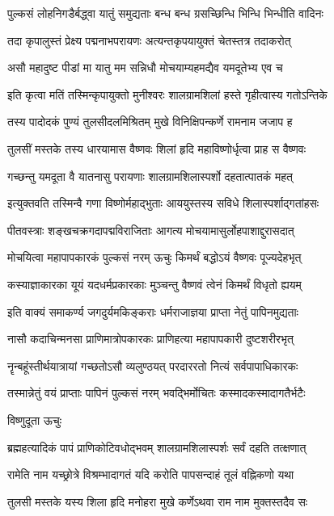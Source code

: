 \twolineshloka
{पुल्कसं लोहनिगडैर्बद्ध्वा यातुं समुद्यताः}
{बन्ध बन्ध ग्रसच्छिन्धि भिन्धि भिन्धीति वादिनः}%

\twolineshloka
{तदा कृपालुस्तं प्रेक्ष्य पद्मनाभपरायणः}
{अत्यन्तकृपयायुक्तं चेतस्तत्र तदाकरोत्}%

\twolineshloka
{असौ महादुष्ट पीडां मा यातु मम सन्निधौ}
{मोचयाम्यहमद्यैव यमदूतेभ्य एव च}%

\twolineshloka
{इति कृत्वा मतिं तस्मिन्कृपायुक्तो मुनीश्वरः}
{शालग्रामशिलां हस्ते गृहीत्वास्य गतोऽन्तिके}%

\twolineshloka
{तस्य पादोदकं पुण्यं तुलसीदलमिश्रितम्}
{मुखे विनिक्षिपन्कर्णे रामनाम जजाप ह}%

\twolineshloka
{तुलसीं मस्तके तस्य धारयामास वैष्णवः}
{शिलां हृदि महाविष्णोर्धृत्वा प्राह स वैष्णवः}%

\twolineshloka
{गच्छन्तु यमदूता वै यातनासु परायणाः}
{शालग्रामशिलास्पर्शो दहतात्पातकं महत्}%

\twolineshloka
{इत्युक्तवति तस्मिन्वै गणा विष्णोर्महाद्भुताः}
{आययुस्तस्य सविधे शिलास्पर्शाद्गतांहसः}%

\twolineshloka
{पीतवस्त्राः शङ्खचक्रगदापद्मविराजिताः}
{आगत्य मोचयामासुर्लोहपाशाद्दुरासदात्}%

\twolineshloka
{मोचयित्वा महापापकारकं पुल्कसं नरम्}
{ऊचुः किमर्थं बद्धोऽयं वैष्णवः पूज्यदेहभृत्}%

\twolineshloka
{कस्याज्ञाकारका यूयं यदधर्मप्रकारकाः}
{मुञ्चन्तु वैष्णवं त्वेनं किमर्थं विधृतो ह्ययम्}%

\twolineshloka
{इति वाक्यं समाकर्ण्य जगदुर्यमकिङ्कराः}
{धर्मराजाज्ञया प्राप्ता नेतुं पापिनमुद्यताः}%

\twolineshloka
{नासौ कदाचिन्मनसा प्राणिमात्रोपकारकः}
{प्राणिहत्या महापापकारी दुष्टशरीरभृत्}%

\twolineshloka
{नॄन्बहूंस्तीर्थयात्रायां गच्छतोऽसौ व्यलुण्ठयत्}
{परदाररतो नित्यं सर्वपापाधिकारकः}%

\twolineshloka
{तस्मान्नेतुं वयं प्राप्ताः पापिनं पुल्कसं नरम्}
{भवद्भिर्मोचितः कस्मादकस्मादागतैर्भटैः}%

विष्णुदूता ऊचुः

\twolineshloka
{ब्रह्महत्यादिकं पापं प्राणिकोटिवधोद्भवम्}
{शालग्रामशिलास्पर्शः सर्वं दहति तत्क्षणात्}%

\twolineshloka
{रामेति नाम यच्छ्रोत्रे विश्रम्भादागतं यदि}
{करोति पापसन्दाहं तूलं वह्निकणो यथा}%

\twolineshloka
{तुलसी मस्तके यस्य शिला हृदि मनोहरा}
{मुखे कर्णेऽथवा राम नाम मुक्तस्तदैव सः}%

